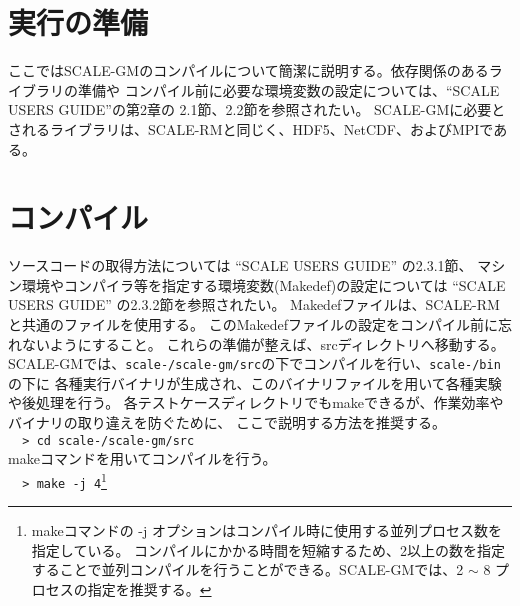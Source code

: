 \section{実行の準備}
ここではSCALE-GMのコンパイルについて簡潔に説明する。依存関係のあるライブラリの準備や
コンパイル前に必要な環境変数の設定については、``SCALE USERS GUIDE''の第2章の
2.1節、2.2節を参照されたい。
SCALE-GMに必要とされるライブラリは、SCALE-RMと同じく、HDF5、NetCDF、およびMPIである。

\section{コンパイル}
ソースコードの取得方法については ``SCALE USERS GUIDE'' の2.3.1節、
マシン環境やコンパイラ等を指定する環境変数(Makedef)の設定については
 ``SCALE USERS GUIDE'' の2.3.2節を参照されたい。
Makedefファイルは、SCALE-RMと共通のファイルを使用する。
このMakedefファイルの設定をコンパイル前に忘れないようにすること。
これらの準備が整えば、srcディレクトリへ移動する。
SCALE-GMでは、\texttt{scale-{\version}/scale-gm/src}の下でコンパイルを行い、\texttt{scale-{\version}/bin}の下に
各種実行バイナリが生成され、このバイナリファイルを用いて各種実験や後処理を行う。
各テストケースディレクトリでもmakeできるが、作業効率やバイナリの取り違えを防ぐために、
ここで説明する方法を推奨する。\\

\verb|  > cd scale-|{\version}\verb|/scale-gm/src|\\


\noindent makeコマンドを用いてコンパイルを行う。\\

\verb|  > make -j 4|\footnote{makeコマンドの -j オプションはコンパイル時に使用する並列プロセス数を指定している。   コンパイルにかかる時間を短縮するため、2以上の数を指定することで並列コンパイルを行うことができる。SCALE-GMでは、2 $\sim$ 8 プロセスの指定を推奨する。}\\

